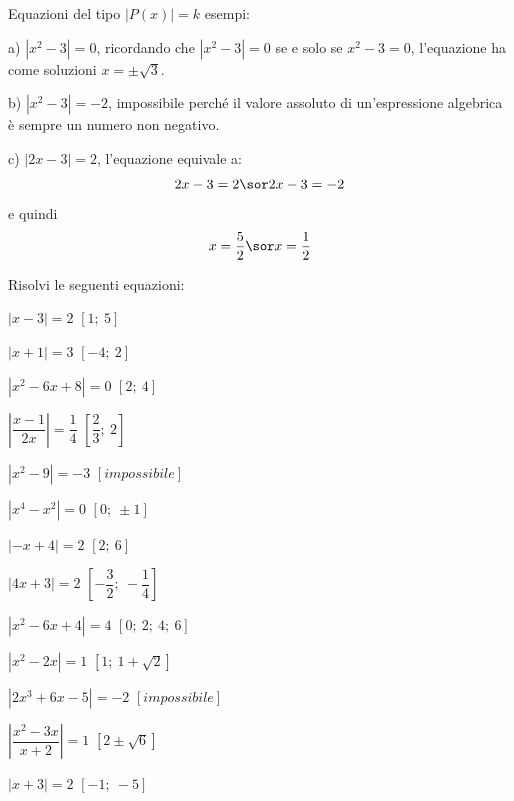 \begin{esercizio}\label{ese:03.1}
Equazioni del tipo \(|P(x)|=k\) esempi:
\begin{enumeratea}
\item[a)] \(|x^2-3|=0\), ricordando che \(|x^2-3|=0\) se e solo se 
\(x^2-3=0\), 
l'equazione ha come soluzioni \(x=\pm\sqrt{3}\).
\item[b)] \(|x^2-3|=-2\), impossibile perché il valore assoluto di 
un'espressione 
algebrica è sempre un numero non negativo.
\item[c)] \(|2x-3|=2\), l'equazione equivale a:
\[2x-3=2 \sor 2x-3=-2\]
e quindi
\[x=\dfrac{5}{2}\sor x=\dfrac{1}{2}\]
\end{enumeratea}

\noindent Risolvi le seguenti equazioni:

\begin{multicols}{2}
\begin{enumeratea}
\item \(|x-3|=2\)
 \hfill \(\left[ 1;~5\right] \)
\item \(|x+1|=3\)
 \hfill \(\left[ -4;~2\right] \)
\item \(|x^2-6x+8|=0\)
 \hfill \(\left[ 2;~4\right] \)
\item \(\left| \dfrac{x-1}{2x}\right| =\dfrac{1}{4}\)
 \hfill \(\left[ 
\dfrac{2}{3};~2\right] \)
\item \(|x^2-9|=-3\)
 \hfill \(\left[impossibile \right] \)
\item \(|x^4-x^2|=0\)
 \hfill \(\left[ 0;~\pm 1\right] \)
\item \(|-x+4|=2\)
 \hfill \(\left[ 2;~6\right] \)
\item \(|4x+3|=2\)
 \hfill \(\left[ -\dfrac{3}{2};~-\dfrac{1}{4} \right] \)
\item \(|x^2-6x+4|=4\)
 \hfill \(\left[ 0;~2;~4 ;~6 \right] \)
\item \(|x^2-2x|=1\)
 \hfill \(\left[ 1;~1+\sqrt{2} \right] \)
\item \(|2x^3+6x-5|=-2\)
 \hfill \(\left[ impossibile \right] \)
\item \(\left| \dfrac{x^2-3x}{x+2}\right| =1\)
 \hfill \(\left[ 2\pm 
\sqrt{6} \right] \)
\item \(|x+3|=2\)
 \hfill \(\left[ -1;~-5 \right] \)
\end{enumeratea}
\end{multicols}
\end{esercizio}

